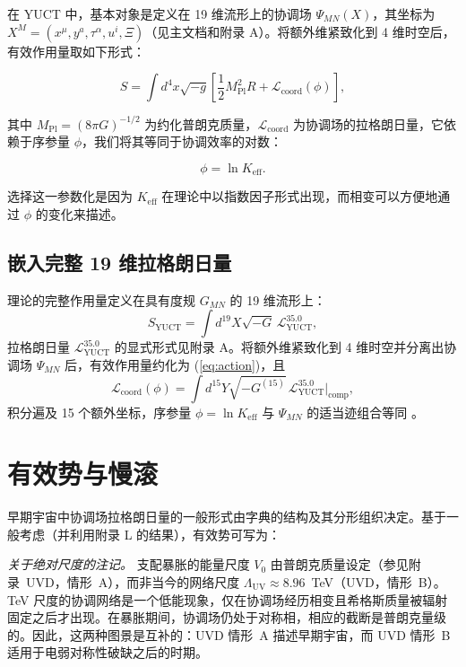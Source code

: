 \documentclass[11pt,a4paper]{article}
\newcommand{\Keff}{K_{\mathrm{eff}}}
\newcommand{\Mpl}{M_{\mathrm{Pl}}}
\begin{document}
	在 YUCT 中，基本对象是定义在 19 维流形上的协调场 \(\Psi_{MN}(X)\)，其坐标为 \(X^M = (x^\mu, y^a, \tau^\alpha, u^i, \Xi)\)（见主文档和附录 A）。将额外维紧致化到 4 维时空后，有效作用量取如下形式：
	
	\begin{equation}
		S = \int d^4x \sqrt{-g} \left[ \frac{1}{2} \Mpl^2 R + \mathcal{L}_{\mathrm{coord}}(\phi) \right],
		\label{eq:action}
	\end{equation}
	
	其中 \(\Mpl = (8\pi G)^{-1/2}\) 为约化普朗克质量，\(\mathcal{L}_{\mathrm{coord}}\) 为协调场的拉格朗日量，它依赖于序参量 \(\phi\)，我们将其等同于协调效率的对数：
	
	\begin{equation}
		\phi = \ln \Keff.
		\label{eq:phi-def}
	\end{equation}
	
	选择这一参数化是因为 \(\Keff\) 在理论中以指数因子形式出现，而相变可以方便地通过 \(\phi\) 的变化来描述。
	
	\subsection{嵌入完整 19 维拉格朗日量}
	
	理论的完整作用量定义在具有度规 \(G_{MN}\) 的 19 维流形上：
	\begin{equation}
		S_{\text{YUCT}} = \int d^{19}X \sqrt{-G} \, \mathcal{L}_{\text{YUCT}}^{35.0},
		\label{eq:full-action}
	\end{equation}
	拉格朗日量 \(\mathcal{L}_{\text{YUCT}}^{35.0}\) 的显式形式见附录 A。将额外维紧致化到 4 维时空并分离出协调场 \(\Psi_{MN}\) 后，有效作用量约化为 (\ref{eq:action})，且
	\begin{equation}
		\mathcal{L}_{\mathrm{coord}}(\phi) = \int d^{15}Y \sqrt{-G^{(15)}} \, \mathcal{L}_{\text{YUCT}}^{35.0}\big|_{\text{comp}},
	\end{equation}
	积分遍及 15 个额外坐标，序参量 \(\phi = \ln\Keff\) 与 \(\Psi_{MN}\) 的适当迹组合等同 \cite{Yakushev2026}。
	
	\section{有效势与慢滚}
	\label{sec:potential}
	
	早期宇宙中协调场拉格朗日量的一般形式由字典的结构及其分形组织决定。基于一般考虑（并利用附录 L 的结果），有效势可写为：
	
	\noindent\textit{关于绝对尺度的注记。}
	支配暴胀的能量尺度 \(V_0\) 由普朗克质量设定（参见附录~UVD，情形~A），而非当今的网络尺度 \(\Lambda_{\mathrm{UV}} \approx 8.96\)~TeV（UVD，情形~B）。TeV 尺度的协调网络是一个低能现象，仅在协调场经历相变且希格斯质量被辐射固定之后才出现。在暴胀期间，协调场仍处于对称相，相应的截断是普朗克量级的。因此，这两种图景是互补的：UVD 情形~A 描述早期宇宙，而 UVD 情形~B 适用于电弱对称性破缺之后的时期。
	
\end{document}
